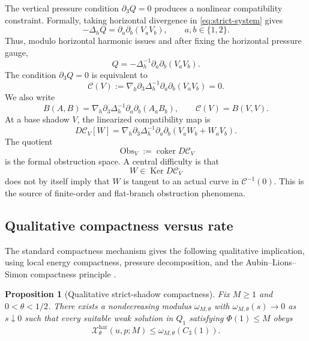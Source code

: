 \documentclass[11pt]{article}
\numberwithin{equation}{section}
\newtheorem{proposition}[theorem]{Proposition}
\DeclareMathOperator{\Ker}{Ker}
\DeclareMathOperator{\coker}{coker}
\newcommand{\har}{\mathrm{har}}
\newcommand{\nabh}{\nabla_h}
\newcommand{\calC}{\mathcal C}
\newcommand{\calX}{\mathcal X}
\newcommand{\Obs}{\operatorname{Obs}}
\begin{document}
The vertical pressure condition \(\partial_3Q=0\) produces a nonlinear compatibility constraint.  Formally, taking horizontal divergence in \eqref{eq:strict-system} gives
\[
-\Delta_h Q=\partial_a\partial_b(V_aV_b),
\qquad a,b\in\{1,2\}.
\]
Thus, modulo horizontal harmonic issues and after fixing the horizontal pressure gauge,
\[
Q=-\Delta_h^{-1}\partial_a\partial_b(V_aV_b).
\]
The condition \(\partial_3Q=0\) is equivalent to
\begin{equation}\label{eq:compatibility-map}
\calC(V):=\nabh\partial_3\Delta_h^{-1}\partial_a\partial_b(V_aV_b)=0.
\end{equation}
We also write
\begin{equation}\label{eq:B-bilinear}
B(A,B)=\nabh\partial_3\Delta_h^{-1}\partial_a\partial_b(A_aB_b),
\qquad
\calC(V)=B(V,V).
\end{equation}
At a base shadow \(V\), the linearized compatibility map is
\begin{equation}\label{eq:linearized-compatibility}
D\calC_V[W]
=
\nabh\partial_3\Delta_h^{-1}\partial_a\partial_b(V_aW_b+W_aV_b).
\end{equation}
The quotient
\[
\Obs_V:=\coker D\calC_V
\]
is the formal obstruction space.  A central difficulty is that
\[
W\in\Ker D\calC_V
\]
does not by itself imply that \(W\) is tangent to an actual curve in \(\calC^{-1}(0)\).  This is the source of finite-order and flat-branch obstruction phenomena.

\subsection{Qualitative compactness versus rate}

The standard compactness mechanism gives the following qualitative implication, using local energy compactness, pressure decomposition, and the Aubin--Lions--Simon compactness principle \cite{Simon1986,CKN1982,Seregin2015}.

\begin{proposition}[Qualitative strict-shadow compactness]\label{prop:qual-compactness}
Fix \(M\ge1\) and \(0<\theta<1/2\).  There exists a nondecreasing modulus \(\omega_{M,\theta}\) with \(\omega_{M,\theta}(s)\to0\) as \(s\downarrow0\) such that every suitable weak solution in \(Q_1\) satisfying \(\Phi(1)\le M\) obeys
\begin{equation}\label{eq:qual-compactness}
\calX^{\har}_{\theta}(u,p;M)
\le
\omega_{M,\theta}(C_3(1)).
\end{equation}
\end{proposition}
\end{document}
